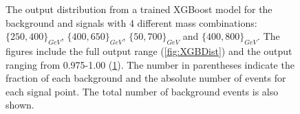 \begin{figure}
{\begin{subfigure}{.6\textwidth}
        \caption{}
        \label{fig:XGBDist_95}
    \end{subfigure}
    \hfill
    }
    \caption[The output distribution from a trained XGBoost model for the background and signals with 4 different mass combination.]{
    The output distribution from a trained XGBoost model for the background and signals with 4 different mass combinations:
    $\{250,400\}_{GeV}$, $\{400,650\}_{GeV}$, $\{50,700\}_{GeV}$ and $\{400,800\}_{GeV}$. 
    The figures include the full output range (\ref{fig:XGBDist}) and the output ranging from 0.975-1.00 (\ref{fig:XGBDist_95}).
    The number in parentheses indicate the fraction of each background and the absolute number of events for each signal point. 
    The total number of background events is also shown.}
    \label{fig:XGBDistComp}
\end{figure}

